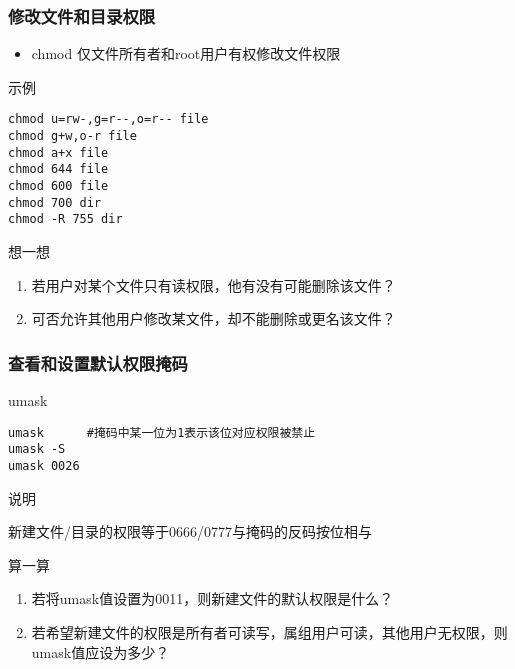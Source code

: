\documentclass[xcolor=svgnames,presentation]{beamer}
\begin{document}
\begin{frame}[fragile]
\frametitle{修改文件和目录权限}
\label{sec-2-1-3}
\begin{itemize}

\item chmod 仅文件所有者和root用户有权修改文件权限
\label{sec-2-1-3-1}%
\end{itemize} %
\begin{exampleblock}{示例}
\label{sec-2-1-3-2}


\begin{verbatim}
chmod u=rw-,g=r--,o=r-- file
chmod g+w,o-r file
chmod a+x file
chmod 644 file
chmod 600 file
chmod 700 dir
chmod -R 755 dir
\end{verbatim}
\end{exampleblock}
\begin{block}{想一想}
\label{sec-2-1-3-3}

\begin{enumerate}
\item 若用户对某个文件只有读权限，他有没有可能删除该文件？
\item 可否允许其他用户修改某文件，却不能删除或更名该文件？
\end{enumerate}
\end{block}
\end{frame}
\begin{frame}[fragile]
\frametitle{查看和设置默认权限掩码}
\label{sec-2-1-4}
\begin{exampleblock}{umask}
\label{sec-2-1-4-1}


\begin{verbatim}
umask      #掩码中某一位为1表示该位对应权限被禁止
umask -S
umask 0026
\end{verbatim}
\end{exampleblock}
\begin{block}{说明}
\label{sec-2-1-4-2}

新建文件/目录的权限等于0666/0777与掩码的反码按位相与
\end{block}
\begin{block}{算一算}
\label{sec-2-1-4-3}

\begin{enumerate}
\item 若将umask值设置为0011，则新建文件的默认权限是什么？
\item 若希望新建文件的权限是所有者可读写，属组用户可读，其他用户无权限，则umask值应设为多少？
\end{enumerate}
\end{block}
\end{frame}
\end{document}
